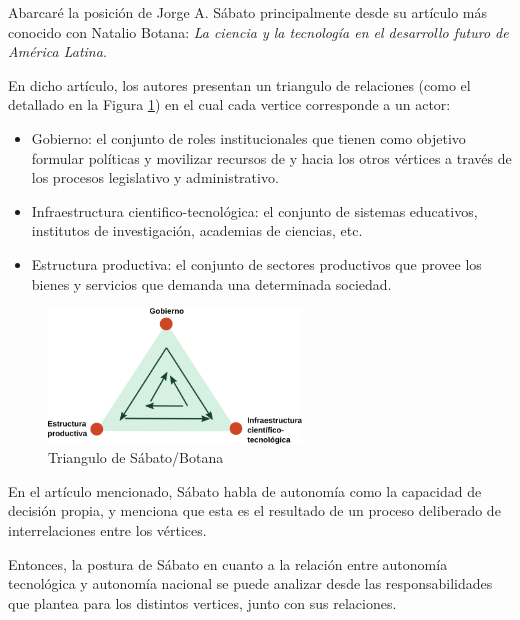 Abarcaré la posición de Jorge A. Sábato principalmente desde su artículo más conocido con Natalio Botana: \textit{La ciencia y
la tecnología en el desarrollo futuro de América Latina}.

En dicho artículo, los autores presentan un triangulo de relaciones (como el detallado en la Figura \ref{triangulo}) en el cual cada vertice
corresponde a un actor:
\begin{itemize}
    \item Gobierno: el conjunto de roles institucionales que tienen como objetivo formular políticas y movilizar recursos de y hacia los otros vértices a través de los procesos legislativo y administrativo.
    \item Infraestructura cientifico-tecnológica: el conjunto de sistemas educativos, institutos de investigación, academias de ciencias, etc.
    \item Estructura productiva: el conjunto de sectores productivos que provee los bienes y servicios que demanda una determinada sociedad.
\end{itemize}

\begin{figure}[H]
    \centering
    \includegraphics[width=0.6\textwidth]{imagenes/sabato.png}
    \caption{Triangulo de Sábato/Botana}\label{triangulo}
\end{figure}


En el artículo mencionado, Sábato habla de autonomía como la capacidad de decisión propia, y menciona que esta es el resultado de un proceso deliberado de interrelaciones entre los vértices.

Entonces, la postura de Sábato en cuanto a la relación entre autonomía tecnológica y
autonomía nacional se puede analizar desde las responsabilidades que plantea para los distintos vertices, junto con sus relaciones.

